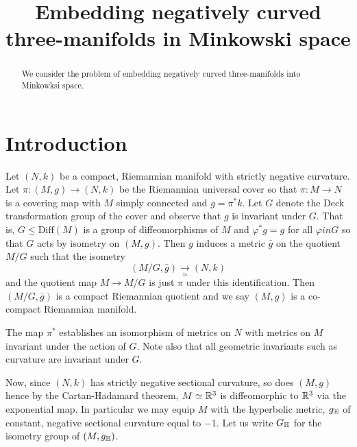 \documentclass[a4paper, 12pt]{amsart}
\begin{document}
\title[Negative curvature Minkowski embedding]{Embedding negatively curved three-manifolds in Minkowski space}

\date{}

\dedicatory{}

\maketitle

\begin{abstract}
We consider the problem of embedding negatively curved three-manifolds into Minkowksi space.
\end{abstract}

\section{Introduction}
\label{sec:intro}

Let \((N, k)\) be a compact, Riemannian manifold with strictly negative curvature. Let \(\pi : (M, g) \to (N, k)\) be the Riemannian universal cover so that \(\pi : M \to N\) is a covering map with \(M\) simply connected and \(g = \pi^{\ast} k\). Let \(G\) denote the Deck transformation group of the cover and observe that \(g\) is invariant under \(G\). That is, \(G \leq \text{Diff}(M)\) is a group of diffeomorphisms of \(M\) and \(\varphi^{\ast} g = g\) for all \(\varphi in G\) so that \(G\) acts by isometry on \((M, g)\). Then \(g\) induces a metric \(\bar{g}\) on the quotient \(M/G\) such that the isometry
\[
(M/G, \bar{g}) \underset{\simeq}{\to} (N, k)
\]
and the quotient map \(M \to M/G\) is just \(\pi\) under this identification. Then \((M/G, \bar{g})\) is a compact Riemannian quotient and we say \((M, g)\) is a co-compact Riemannian manifold.

\begin{rem}
The map \(\pi^{\ast}\) establishes an isomorphism of metrics on \(N\) with metrics on \(M\) invariant under the action of \(G\). Note also that all geometric invariants such as curvature are invariant under \(G\).
\end{rem}

Now, since \((N, k)\) has strictly negative sectional curvature, so does \((M, g)\) hence by the Cartan-Hadamard theorem, \(M \simeq \mathbb{R}^3\) is diffeomorphic to \(\mathbb{R}^3\) via the exponential map. In particular we may equip \(M\) with the hyperbolic metric, \(g_{\mathbb{H}}\) of constant, negative sectional curvature equal to \(-1\). Let us write \(G_{\mathbb{H}}\) for the isometry group of \((M, g_{\mathbb{H}})\).
\end{document}
